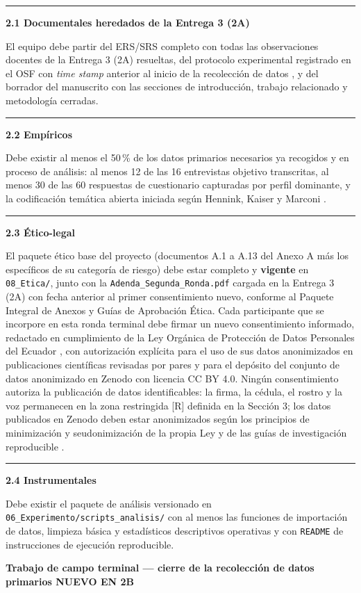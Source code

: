 \documentclass[11pt,a4paper]{article}
\newcounter{secc}
\newcommand{\secband}[1]{%
    \stepcounter{secc}\par\vspace{9pt}\noindent
    {\setlength{\fboxsep}{0pt}%
        \colorbox{uteqgold}{\parbox[c][20pt][c]{0.05\textwidth}{\centering\textbf{\color{white}\small \arabic{secc}}}}%
        \colorbox{uteqgreen}{\parbox[c][20pt][c]{0.95\textwidth}{\hspace{8pt}\textbf{\color{white}\small #1}}}%
    }\par\vspace{5pt}}
\newcommand{\submark}[1]{\par\vspace{4pt}\noindent
    {\color{uteqgreen}\rule[-1pt]{3.5pt}{12pt}}\hspace{6pt}\textbf{\color{uteqgreen}#1}\par\vspace{2pt}}
\newcommand{\bF}{{\setlength{\fboxsep}{1.5pt}\colorbox{crimsonfin}{\scriptsize\bfseries\color{white}NUEVO EN 2B}}}
\begin{document}
\submark{2.1 Documentales heredados de la Entrega 3 (2A)}
El equipo debe partir del ERS/SRS completo con todas las observaciones docentes de la Entrega 3 (2A) resueltas, del protocolo experimental registrado en el OSF con \emph{time stamp} anterior al inicio de la recolección de datos \cite{nosek2018preregistration}, y del borrador del manuscrito con las secciones de introducción, trabajo relacionado y metodología cerradas.

\submark{2.2 Empíricos}
Debe existir al menos el 50\,\% de los datos primarios necesarios ya recogidos y en proceso de análisis: al menos 12 de las 16 entrevistas objetivo transcritas, al menos 30 de las 60 respuestas de cuestionario capturadas por perfil dominante, y la codificación temática abierta iniciada según Hennink, Kaiser y Marconi \cite{hennink2017saturation}.

\submark{2.3 Ético-legal}
El paquete ético base del proyecto (documentos A.1 a A.13 del Anexo A más los específicos de su categoría de riesgo) debe estar completo y \textbf{vigente} en \texttt{08\_Etica/}, junto con la \texttt{Adenda\_Segunda\_Ronda.pdf} cargada en la Entrega 3 (2A) con fecha anterior al primer consentimiento nuevo, conforme al Paquete Integral de Anexos y Guías de Aprobación Ética.
Cada participante que se incorpore en esta ronda terminal debe firmar un nuevo consentimiento informado, redactado en cumplimiento de la Ley Orgánica de Protección de Datos Personales del Ecuador \cite{ley_datos_ecuador_2021}, con autorización explícita para el uso de sus datos anonimizados en publicaciones científicas revisadas por pares y para el depósito del conjunto de datos anonimizado en Zenodo con licencia CC BY 4.0.
Ningún consentimiento autoriza la publicación de datos identificables: la firma, la cédula, el rostro y la voz permanecen en la zona restringida [R] definida en la Sección 3; los datos publicados en Zenodo deben estar anonimizados según los principios de minimización y seudonimización de la propia Ley y de las guías de investigación reproducible \cite{molleri2020checklist,wilkinson2016fair}.

\submark{2.4 Instrumentales}
Debe existir el paquete de análisis versionado en \texttt{06\_Experimento/scripts\_analisis/} con al menos las funciones de importación de datos, limpieza básica y estadísticos descriptivos operativas y con \texttt{README} de instrucciones de ejecución reproducible.

\secband{Trabajo de campo terminal --- cierre de la recolección de datos primarios \bF}
\end{document}
